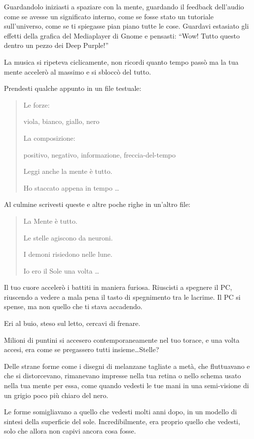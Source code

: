 Guardandolo iniziasti a spaziare con la mente, guardando il feedback dell'audio come se avesse un significato interno, come se fosse stato un tutoriale sull'universo, come se ti spiegasse pian piano tutte le cose. Guardavi estasiato gli effetti della grafica del Mediaplayer di Gnome e pensasti: ``Wow! Tutto questo dentro un pezzo dei Deep Purple!''

La musica si ripeteva ciclicamente, non ricordi quanto tempo passò ma la tua mente accelerò al massimo e si sbloccò del tutto.

Prendesti qualche appunto in un file testuale:

\begin{quote}
{\ttfamily\small
Le forze:

viola, bianco, giallo, nero

La composizione:

positivo, negativo, informazione, freccia-del-tempo

Leggi anche la mente è tutto.

Ho staccato appena in tempo \ldots
}
\end{quote}

Al culmine scrivesti queste e altre poche righe in un'altro file:

\begin{quote}
{\ttfamily\small

La Mente è tutto.

Le stelle agiscono da neuroni.

I demoni risiedono nelle lune.

Io ero il Sole una volta \ldots
}
\end{quote}

Il tuo cuore accelerò i battiti in maniera furiosa. Riuscisti a spegnere il PC, riuscendo a vedere a mala pena il tasto di spegnimento tra le lacrime. Il PC si spense, ma non quello che ti stava accadendo.

Eri al buio, steso sul letto, cercavi di frenare.

Milioni di puntini si accesero contemporaneamente nel tuo torace, e una volta accesi, era come se pregassero tutti insieme\ldots Stelle?

Delle strane forme come i disegni di melanzane tagliate a metà, che fluttuavano e che si distorcevano, rimanevano impresse nella tua retina o nello schema usato nella tua mente per essa, come quando vedesti le tue mani in una semi-visione di un grigio poco più chiaro del nero.

Le forme somigliavano a quello che vedesti molti anni dopo, in un modello di sintesi della superficie del sole. Incredibilmente, era proprio quello che vedesti, solo che allora non capivi ancora cosa fosse.

